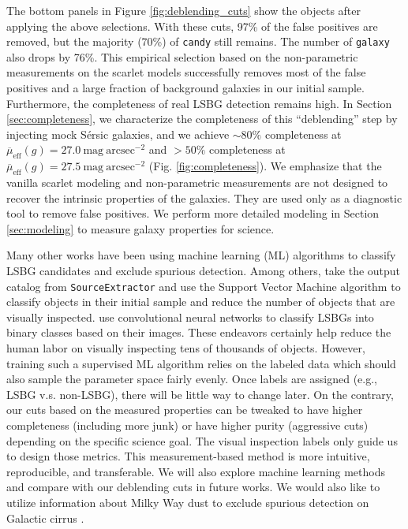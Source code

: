 \documentclass[twocolumn,astrosymb,twocolappendix]{aastex631}
\newcommand{\sbunit}{\mathrm{mag\ arcsec}^{-2}}
\newcommand{\sbeff}{\overline{\mu}_{\mathrm{eff}}(g)}
\newcommand{\code}[1]{\texttt{#1}}
\newcommand{\sersic}{S\'ersic}
\begin{document}
\begin{CJK*}{UTF8}{gbsn}
The bottom panels in Figure \ref{fig:deblending_cuts} show the objects after applying the above selections. With these cuts, 97\% of the false positives are removed, but the majority (70\%) of \code{candy} still remains. The number of \code{galaxy} also drops by 76\%. This empirical selection based on the non-parametric measurements on the scarlet models successfully removes most of the false positives and a large fraction of background galaxies in our initial sample. Furthermore, the completeness of real LSBG detection remains high. In Section \ref{sec:completeness}, we characterize the completeness of this ``deblending'' step by injecting mock \sersic{} galaxies, and we achieve $\sim80\%$ completeness at $\sbeff = 27.0\ \sbunit$ and $>50\%$ completeness at $\sbeff = 27.5\ \sbunit$ (Fig. \ref{fig:completeness}). We emphasize that the vanilla scarlet modeling and non-parametric measurements are not designed to recover the intrinsic properties of the galaxies. They are used only as a diagnostic tool to remove false positives. We perform more detailed modeling in Section \ref{sec:modeling} to measure galaxy properties for science. 


Many other works have been using machine learning (ML) algorithms to classify LSBG candidates and exclude spurious detection. Among others, \citet{Tanoglidis2021} take the output catalog from \code{SourceExtractor} and use the Support Vector Machine algorithm to classify objects in their initial sample and reduce the number of objects that are visually inspected. \citet{Zaritsky2019,Zaritsky2021,Zaritsky2022} use convolutional neural networks to classify LSBGs into binary classes based on their images. These endeavors certainly help reduce the human labor on visually inspecting tens of thousands of objects. However, training such a supervised ML algorithm relies on the labeled data which should also sample the parameter space fairly evenly. Once labels are assigned (e.g., LSBG v.s. non-LSBG), there will be little way to change later. On the contrary, our cuts based on the measured properties can be tweaked to have higher completeness  (including more junk) or have higher purity (aggressive cuts) depending on the specific science goal. The visual inspection labels only guide us to design those metrics. This measurement-based method is more intuitive, reproducible, and transferable. We will also explore machine learning methods and compare with our deblending cuts in future works. We would also like to utilize information about Milky Way dust to exclude spurious detection on Galactic cirrus \citep[e.g.,][]{Zaritsky2021,Zaritsky2022}.


\end{CJK*}
\end{document}
